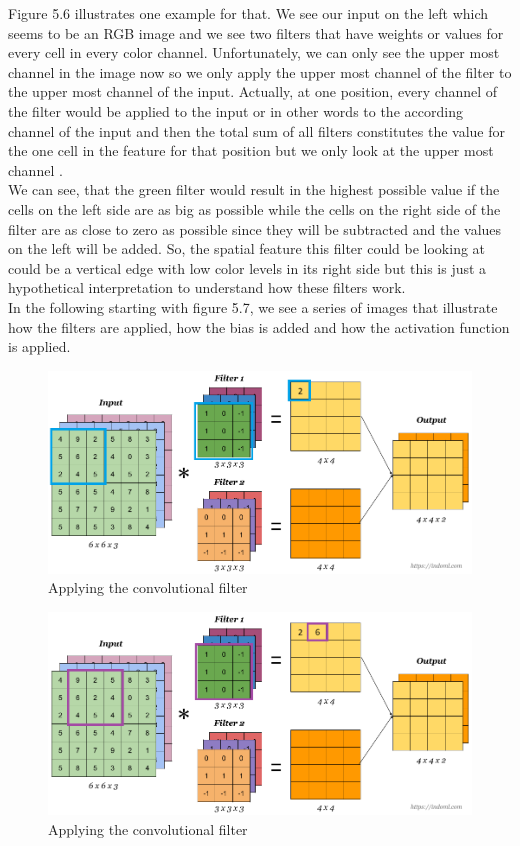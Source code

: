 \documentclass[a4paper,12pt]{report}
\begin{document}
Figure 5.6 illustrates one example for that. We see our input on the left which seems to be an RGB image and we see two filters that have weights or values for every cell in every color channel. Unfortunately, we can only see the upper most channel in the image now so we only apply the upper most channel of the filter to the upper most channel of the input. Actually, at one position, every channel of the filter would be applied to the input or in other words to the according channel of the input and then the total sum of all filters constitutes the value for the one cell in the feature for that position but we only look at the upper most channel \cite{51}.\\
	
We can see, that the green filter would result in the highest possible value if the cells on the left side are as big as possible while the cells on the right side of the filter are as close to zero as possible since they will be subtracted and the values on the left will be added. So, the spatial feature this filter could be looking at could be a vertical edge with low color levels in its right side but this is just a hypothetical interpretation to understand how these filters work.\\
	
In the following starting with figure 5.7, we see a series of images that illustrate how the filters are applied, how the bias is added and how the activation function is applied.
\begin{figure}[htbp]
  \centering
  \includegraphics[width=\textwidth]{images/CNN_filters_0.png}
  \caption{Applying the convolutional filter}
  \label{fig:fullwidth}
\end{figure}
	
\begin{figure}[htbp]
  \centering
  \includegraphics[width=\textwidth]{images/CNN_filters_1.png}
  \caption{Applying the convolutional filter}
  \label{fig:fullwidth}
\end{figure}
\end{document}
